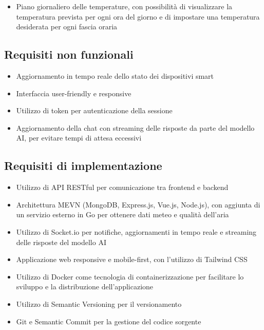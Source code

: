 \documentclass[a4paper,12pt]{article}
\begin{document}
\begin{itemize}
    \begin{itemize}
        \item Effettuare logout
        \item (Admin) Gestire gli utenti, con possibilità di visualizzare e modificare i permessi degli utenti della casa
        \item Definire quali notifiche ricevere
    \end{itemize}
    \item Piano giornaliero delle temperature, con possibilità di visualizzare la temperatura prevista per ogni ora del giorno e di impostare una temperatura desiderata per ogni fascia oraria
\end{itemize}
\subsection{Requisiti non funzionali}
\begin{itemize}
    \item Aggiornamento in tempo reale dello stato dei dispositivi smart
    \item Interfaccia user-friendly e responsive
    \item Utilizzo di token per autenticazione della sessione
    \item Aggiornamento della chat con streaming delle risposte da parte del modello AI, per evitare tempi di attesa eccessivi
\end{itemize}
\subsection{Requisiti di implementazione}
\begin{itemize}
    \item Utilizzo di API RESTful per comunicazione tra frontend e backend
    \item Architettura MEVN (MongoDB, Express.js, Vue.js, Node.js), con aggiunta di un servizio esterno in Go per ottenere dati meteo e qualità dell'aria
    \item Utilizzo di Socket.io per notifiche, aggiornamenti in tempo reale e streaming delle risposte del modello AI
    \item Applicazione web responsive e mobile-first, con l'utilizzo di Tailwind CSS
    \item Utilizzo di Docker come tecnologia di containerizzazione per facilitare lo sviluppo e la distribuzione dell'applicazione
    \item Utilizzo di Semantic Versioning per il versionamento
    \item Git e Semantic Commit per la gestione del codice sorgente
\end{itemize}
\end{document}

